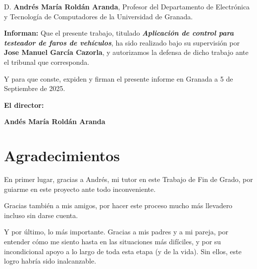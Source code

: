D. \textbf{Andrés María Roldán Aranda}, Profesor del Departamento de Electrónica y Tecnología de Computadores de la Universidad de Granada.

\vspace{0.5cm}

\textbf{Informan:}
Que el presente trabajo, titulado \textit{\textbf{Aplicación de control para testeador de faros de vehículos}}, ha sido realizado bajo su supervisión por \textbf{Jose Manuel García Cazorla}, y autorizamos la defensa de dicho trabajo ante el tribunal que corresponda.

\vspace{0.5cm}

Y para que conste, expiden y firman el presente informe en Granada a 5 de Septiembre de 2025.

\vspace{1cm}

\textbf{El director:}

\vspace{5cm}

\noindent\textbf{Andés María Roldán Aranda}

\chapter*{Agradecimientos}

En primer lugar, gracias a Andrés, mi tutor en este Trabajo de Fin de Grado, por guiarme en este proyecto ante todo inconveniente.

Gracias también a mis amigos, por hacer este proceso mucho más llevadero incluso sin darse cuenta.

Y por último, lo más importante. Gracias a mis padres y a mi pareja, por entender cómo me siento hasta en las situaciones más difíciles, y por su incondicional apoyo a lo largo de toda esta etapa (y de la vida). Sin ellos, este logro habría sido inalcanzable.

\thispagestyle{empty}

\vspace{1cm}
